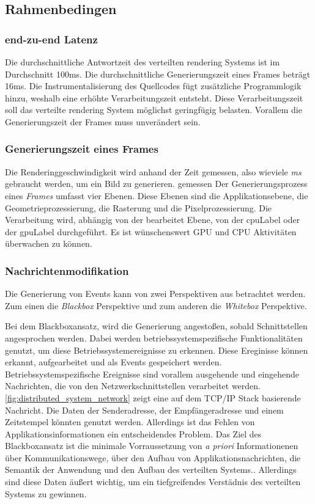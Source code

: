 \subsection{Rahmenbedingen}
\label{subsection:Rahmenbedingen}
\subsubsection{end-zu-end Latenz}
\label{subsubsection:end-zu-end Latenz}
Die durchschnittliche Antwortzeit des verteilten rendering Systems ist im Durchschnitt 100ms. Die durchschnittliche Generierungszeit eines Frames beträgt 16ms. Die Instrumentalisierung des Quellcodes fügt zusätzliche Programmlogik hinzu, weshalb eine erhöhte Verarbeitungszeit entsteht. Diese Verarbeitungszeit soll das verteilte rendering System möglichst geringfügig belasten. Vorallem die Generierungszeit der Frames muss unverändert sein.

\subsubsection{Generierungszeit eines Frames}
\label{subsubsection:Generierungszeit eines Frames}
Die Renderinggeschwindigkeit wird anhand der Zeit gemessen, also wieviele \emph{ms} gebraucht werden, um ein Bild zu generieren. gemessen Der Generierungsprozess eines \emph{Frames} umfasst vier Ebenen. Diese Ebenen sind die Applikationsebene, die Geometrieprozessierung, die Rasterung und die Pixelprozessierung. Die Verarbeitung wird, abhängig von der bearbeitet Ebene, von der \gls{cpuLabel} oder der \gls{gpuLabel} durchgeführt. Es ist wünschenswert GPU und CPU Aktivitäten überwachen zu können.

\subsubsection{Nachrichtenmodifikation}
\label{subsubsection:Nachrichtenmodifikation}

Die Generierung von Events kann von zwei Perspektiven aus betrachtet werden.
Zum einen die \emph{Blackbox} Perspektive und zum anderen die \emph{Whitebox} Perspektive.

Bei dem Blackboxansatz, wird die Generierung angestoßen, sobald Schnittstellen angesprochen werden. Dabei werden betriebssystemspezifische Funktionalitäten genutzt, um diese Betriebssystemereignisse zu erkennen. Diese Ereginisse können erkannt, aufgearbeitet und als Events gespeichert werden. Betriebssystemspezifische Ereignisse sind vorallem ausgehende und eingehende Nachrichten, die von den Netzwerkschnittstellen verarbeitet werden. \cref{fig:distributed_system_network} zeigt eine auf dem TCP/IP Stack basierende Nachricht. Die Daten der Senderadresse, der Empfängeradresse und einem Zeitstempel könnten genutzt werden. Allerdings ist das Fehlen von Applikationsinformationen ein entscheidendes Problem. Das Ziel des Blackboxansatz ist die minimale Vorraussetzung von \emph{a priori} Informationenen über Kommunikationswege, über den Aufbau von Applikationsnachrichten, die Semantik der Anwendung und den Aufbau des verteilten Systems.. Allerdings sind diese Daten äußert wichtig, um ein tiefgreifendes Verstädnis des verteilten Systems zu gewinnen. 


